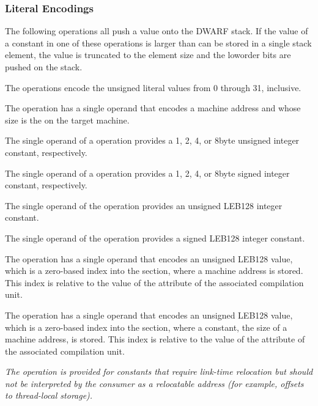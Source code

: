 \subsubsection{Literal Encodings}
\label{chap:literalencodings}
The 
following operations all push a value onto the DWARF
stack. 
If the value of a constant in one of these operations
is larger than can be stored in a single stack element, the
value is truncated to the element size and the low\dash order bits
are pushed on the stack.
\begin{enumerate}[1. ]
\itembfnl{\DWOPlitzeroTARG, \DWOPlitoneTARG, \dots, \DWOPlitthirtyoneTARG}
The \DWOPlitnNAME{} operations encode the unsigned literal values
from 0 through 31, inclusive.

\itembfnl{\DWOPaddrTARG}
The \DWOPaddrNAME{} operation has a single operand that encodes
a machine address and whose size is the 
on the target machine.

\itembfnl{\DWOPconstoneuTARG, \DWOPconsttwouTARG, \DWOPconstfouruTARG, \DWOPconsteightuTARG}
\DWOPconstnxMARK{}
The single operand of a \DWOPconstnuNAME{} operation provides a 1,
2, 4, or 8\dash byte unsigned integer constant, respectively.

\itembfnl{\DWOPconstonesTARG, \DWOPconsttwosTARG, \DWOPconstfoursTARG, \DWOPconsteightsTARG}
The single operand of a \DWOPconstnsNAME{} operation provides a 1,
2, 4, or 8\dash byte signed integer constant, respectively.

\itembfnl{\DWOPconstuTARG}
The single operand of the \DWOPconstuNAME{} operation provides
an unsigned LEB128 integer constant.

\itembfnl{\DWOPconstsTARG}
The single operand of the \DWOPconstsNAME{} operation provides
a signed LEB128 integer constant.

\itembfnl{\DWOPaddrxTARG}
The \DWOPaddrxNAME{} operation has a single operand that
encodes an unsigned LEB128 value, which is a zero-based
index into the \dotdebugaddr{} section, where a machine
address is stored.
This index is relative to the value of the 
\DWATaddrbase{} attribute of the associated compilation unit.

\itembfnl{\DWOPconstxTARG}
The \DWOPconstxNAME{} operation has a single operand that
encodes an unsigned LEB128 value, which is a zero-based
index into the \dotdebugaddr{} section, where a constant, the
size of a machine address, is stored.
This index is relative to the value of the 
\DWATaddrbase{} attribute of the associated compilation unit.

\textit{The \DWOPconstxNAME{} operation is provided for constants that
require link-time relocation but should not be
interpreted by the consumer as a relocatable address
(for example, offsets to thread-local storage).}

\end{enumerate}



